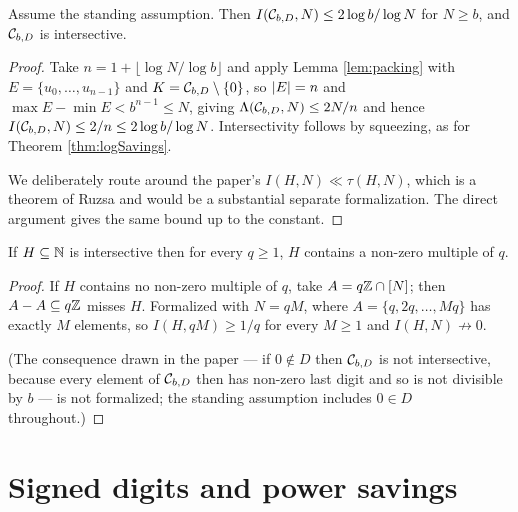\begin{theorem}
  \label{thm:logSavings-intersective}
  \leanok
  Assume the standing assumption. Then
  $I(\mathcal{C}_{b,D}, N) \leq 2\log b / \log N$ for $N \geq b$, and $\mathcal{C}_{b,D}$ is
  intersective.
\end{theorem}
\begin{proof}
  \leanok
  Take $n = 1 + \lfloor \log N / \log b \rfloor$ and apply
  Lemma \ref{lem:packing} with $E = \{u_0, \ldots, u_{n-1}\}$ and
  $K = \mathcal{C}_{b,D} \setminus \{0\}$, so $\left\lvert E \right\rvert = n$ and
  $\max E - \min E < b^{n-1} \leq N$, giving
  $\Lambda(\mathcal{C}_{b,D}, N) \leq 2N/n$ and hence $I(\mathcal{C}_{b,D},N) \leq 2/n \leq
  2 \log b / \log N$. Intersectivity follows by squeezing, as for
  Theorem \ref{thm:logSavings}.

  We deliberately route around the paper's $I(H,N) \ll \tau(H,N)$, which is a
  theorem of Ruzsa and would be a substantial separate formalization. The
  direct argument gives the same bound up to the constant.
\end{proof}

\begin{lemma}[Necessity of $0 \in D$]
  \label{lem:zero-necessary}
  \leanok
  If $H \subseteq \mathbb{N}$ is intersective then for every $q \geq 1$, $H$ contains
  a non-zero multiple of $q$.
\end{lemma}
\begin{proof}
  \leanok
  If $H$ contains no non-zero multiple of $q$, take $A = q\mathbb{Z} \cap [N]$; then
  $A - A \subseteq q\mathbb{Z}$ misses $H$. Formalized with $N = qM$, where
  $A = \{q, 2q, \ldots, Mq\}$ has exactly $M$ elements, so
  $I(H, qM) \geq 1/q$ for every $M \geq 1$ and $I(H,N) \not\to 0$.

  (The consequence drawn in the paper --- if $0 \notin D$ then $\mathcal{C}_{b,D}$ is not
  intersective, because every element of $\mathcal{C}_{b,D}$ then has non-zero last digit
  and so is not divisible by $b$ --- is not formalized; the standing
  assumption includes $0 \in D$ throughout.)
\end{proof}

\section{Signed digits and power savings}

